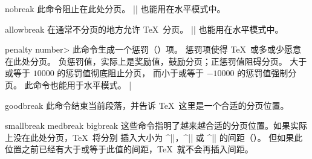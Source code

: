 \begindesc
\ctspecial nobreak {} 
\explain
此命令阻止在此处分页。
|\nobreak| 也能用在水平模式中。
\enddesc

\begindesc
\ctspecial allowbreak {} 
\explain
在通常不分页的地方允许 \TeX\ 分页。
|\allowbreak| 也能用在水平模式中。
\enddesc

\begindesc
\ctspecial penalty {\<number>} 
\explain
此命令生成一个惩罚（）项。
惩罚项使得 \TeX\ 或多或少愿意在此处分页。
负惩罚值，实际上是奖励值，鼓励分页；正惩罚值阻碍分页。
大于或等于 $10000$ 的惩罚值彻底阻止分页，
而小于或等于 $-10000$ 的惩罚值强制分页。
此命令也能用于水平模式。
\example
\def\break{\penalty-10000 } %
\def\nobreak{\penalty10000 } %
\def\allowbreak{\penalty0 } %
|
\endexample
\enddesc

\begindesc
\cts goodbreak {}
\explain
此命令结束当前段落，并告诉 \TeX\ 这里是一个合适的分页位置。
\enddesc

\begindesc
\cts smallbreak {}
\cts medbreak {}
\cts bigbreak {}
\explain
这些命令指明了越来越合适的分页位置。如果实际上没在此处分页，\TeX\ 将分别
插入大小为 ^|\smallskip|，^|\medskip| 或 ^|\bigskip| 的间距（\xref \smallskip ）。
但如果此位置之前已经有大于或等于此值的间距，\TeX\ 就不会再插入间距。
\enddesc

